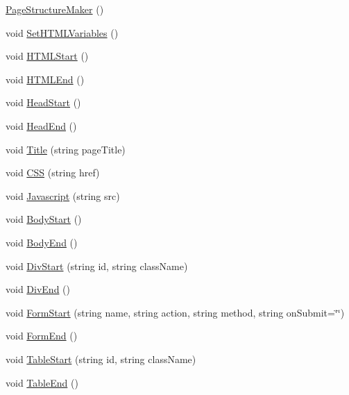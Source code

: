 \begin{DoxyCompactItemize}
\item 
\hyperlink{classPageStructureMaker_a95e6305a2b5121840fb5b74297a040ce}{Page\-Structure\-Maker} ()
\item 
void \hyperlink{classPageStructureMaker_aaf78d67380c400cc0057c6519276f721}{Set\-H\-T\-M\-L\-Variables} ()
\item 
void \hyperlink{classPageStructureMaker_ad25d6abc983253567e2370882fc1b407}{H\-T\-M\-L\-Start} ()
\item 
void \hyperlink{classPageStructureMaker_a63b877af1c2c8de8332e3f7eb4c2c2b0}{H\-T\-M\-L\-End} ()
\item 
void \hyperlink{classPageStructureMaker_a14312134cb108f91f2e6d9cbd6916e97}{Head\-Start} ()
\item 
void \hyperlink{classPageStructureMaker_ad64115d592b0989b422a93f85278186e}{Head\-End} ()
\item 
void \hyperlink{classPageStructureMaker_a81e902ddc0c0287df1ba0f614a3774d6}{Title} (string page\-Title)
\item 
void \hyperlink{classPageStructureMaker_aacdb11817f8ab246bc59c552e04e862d}{C\-S\-S} (string href)
\item 
void \hyperlink{classPageStructureMaker_ac221d1169f4dbcef6adb00938919193d}{Javascript} (string src)
\item 
void \hyperlink{classPageStructureMaker_ab7a645675166f34fac99f1ed8feb7c27}{Body\-Start} ()
\item 
void \hyperlink{classPageStructureMaker_ac91e234e2d54dedd9d7e556fabf21d2b}{Body\-End} ()
\item 
void \hyperlink{classPageStructureMaker_a927f92889555dd316c129f706be86a5c}{Div\-Start} (string id, string class\-Name)
\item 
void \hyperlink{classPageStructureMaker_a2913e76bf188ed777dcd33003ef6207d}{Div\-End} ()
\item 
void \hyperlink{classPageStructureMaker_aa87c4296495fb0a175f40701deda7745}{Form\-Start} (string name, string action, string method, string on\-Submit=\char`\"{}\char`\"{})
\item 
void \hyperlink{classPageStructureMaker_a65d97f23bb543f3db5201b2009f7f65a}{Form\-End} ()
\item 
void \hyperlink{classPageStructureMaker_a04e68e69005f3933e0f496c3db474daf}{Table\-Start} (string id, string class\-Name)
\item 
void \hyperlink{classPageStructureMaker_a7f8fefbe7a825c1b7761fc8a0f1bb8e4}{Table\-End} ()

\end{DoxyCompactItemize}
